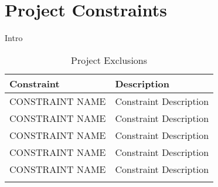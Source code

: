 \section{Project Constraints}

Intro

\begin{longtable}[H]{lp{11cm}}
	
	\toprule[2pt]
	
	\textbf{Constraint} & \textbf{Description} \\ 
	
	\midrule[1.5pt] 
	\endhead
	
	
	CONSTRAINT NAME & Constraint Description \vspace{0.2cm}
	\\ \midrule
	
	CONSTRAINT NAME & Constraint Description \vspace{0.2cm}
	\\ \midrule
	
	CONSTRAINT NAME & Constraint Description \vspace{0.2cm}
	\\ \midrule
	
	CONSTRAINT NAME & Constraint Description \vspace{0.2cm}
	\\ \midrule
	
	CONSTRAINT NAME & Constraint Description \vspace{0.2cm}
	
	\\ \bottomrule[2pt]
	
	\caption{Project Exclusions}
	
\end{longtable}